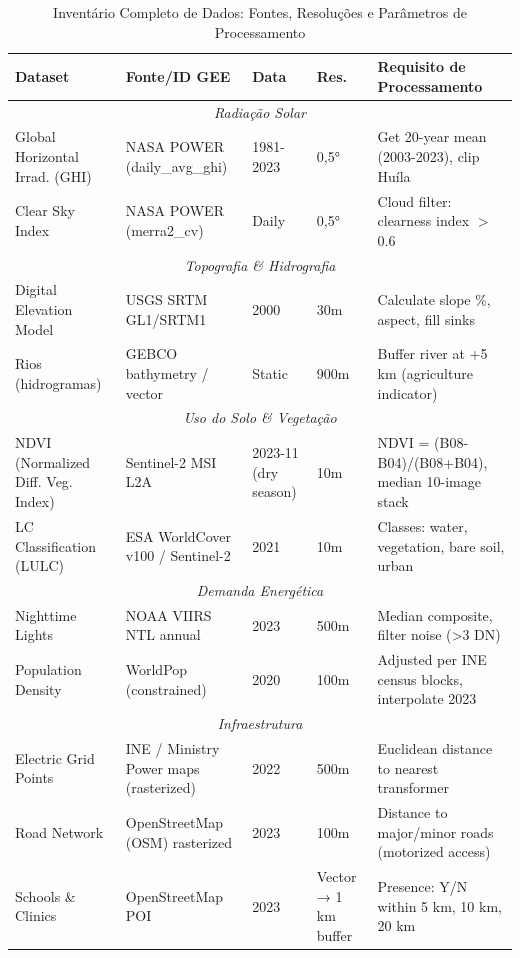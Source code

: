 \documentclass[12pt, a4paper]{article}
\begin{document}
\begin{table}[H]
\centering
\caption{Inventário Completo de Dados: Fontes, Resoluções e Parâmetros de Processamento}
\label{tab:data_inventory}
\footnotesize
\begin{tabular}{|l|l|l|l|l|}
\hline
\textbf{Dataset} & \textbf{Fonte/ID GEE} & \textbf{Data} & \textbf{Res.} & \textbf{Requisito de Processamento} \\
\hline
\multicolumn{5}{|c|}{\textit{Radiação Solar}} \\
\hline
Global Horizontal Irrad. (GHI) & NASA POWER (daily\_avg\_ghi) & 1981-2023 & 0,5° & Get 20-year mean (2003-2023), clip Huíla \\
Clear Sky Index & NASA POWER (merra2\_cv) & Daily & 0,5° & Cloud filter: clearness index $>$ 0.6 \\
\hline
\multicolumn{5}{|c|}{\textit{Topografia \& Hidrografia}} \\
\hline
Digital Elevation Model & USGS SRTM GL1/SRTM1 & 2000 & 30m & Calculate slope \%, aspect, fill sinks \\
Rios (hidrogramas) & GEBCO bathymetry / vector & Static & 900m & Buffer river at +5 km (agriculture indicator) \\
\hline
\multicolumn{5}{|c|}{\textit{Uso do Solo \& Vegetação}} \\
\hline
NDVI (Normalized Diff. Veg. Index) & Sentinel-2 MSI L2A & 2023-11 (dry season) & 10m & NDVI = (B08-B04)/(B08+B04), median 10-image stack \\
LC Classification (LULC) & ESA WorldCover v100 / Sentinel-2 & 2021 & 10m & Classes: water, vegetation, bare soil, urban \\
\hline
\multicolumn{5}{|c|}{\textit{Demanda Energética}} \\
\hline
Nighttime Lights & NOAA VIIRS NTL annual & 2023 & 500m & Median composite, filter noise (>3 DN) \\
Population Density & WorldPop (constrained) & 2020 & 100m & Adjusted per INE census blocks, interpolate 2023 \\
\hline
\multicolumn{5}{|c|}{\textit{Infraestrutura}} \\
\hline
Electric Grid Points & INE / Ministry Power maps (rasterized) & 2022 & 500m & Euclidean distance to nearest transformer \\
Road Network & OpenStreetMap (OSM) rasterized & 2023 & 100m & Distance to major/minor roads (motorized access) \\
Schools \& Clinics & OpenStreetMap POI & 2023 & Vector → 1 km buffer & Presence: Y/N within 5 km, 10 km, 20 km \\
\hline
\end{tabular}
\end{table}
\end{document}
